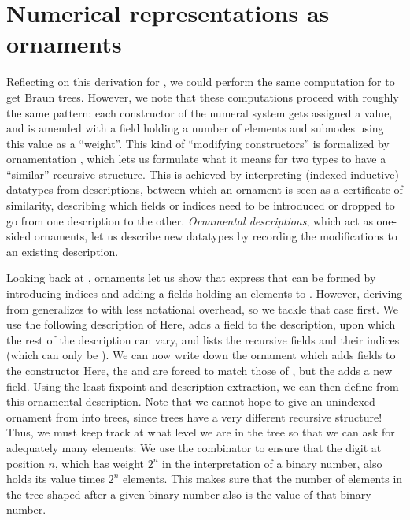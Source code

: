 \section{Numerical representations as ornaments}\label{sec:ornaments}
Reflecting on this derivation for \bN{}, we could perform the same computation for \bL{} to get Braun trees. However, we note that these computations proceed with roughly the same pattern: each constructor of the numeral system gets assigned a value, and is amended with a field holding a number of elements and subnodes using this value as a ``weight''. This kind of ``modifying constructors'' is formalized by ornamentation \cite{progorn}, which lets us formulate what it means for two types to have a ``similar'' recursive structure. This is achieved by interpreting (indexed inductive) datatypes from descriptions, between which an ornament is seen as a certificate of similarity, describing which fields or indices need to be introduced or dropped to go from one description to the other. \textit{Ornamental descriptions}, which act as one-sided ornaments, let us describe new datatypes by recording the modifications to an existing description.

Looking back at , ornaments let us show that express that  can be formed by introducing indices and adding a fields holding an elements to \bN{}.
However, deriving  from \bN{} generalizes to \bL{} with less notational overhead, so we tackle that case first. We use the following description of \bN{}
Here,  adds a field to the description, upon which the rest of the description can vary, and  lists the recursive fields and their indices (which can only be ).
We can now write down the ornament which adds fields to the  constructor
Here, the  and  are forced to match those of ,
but the  adds a new field. Using the least fixpoint and description extraction, we can then define  from this ornamental description. Note that we cannot hope to give an unindexed ornament from \bL{}
into trees, since trees have a very different recursive structure! Thus, we must keep track at what level we are in the tree so that we can ask for adequately many elements:
We use the  combinator to ensure that the digit at position $n$, which has weight $2^n$ in the interpretation of a binary number, also holds its value times $2^n$ elements. This makes sure that the number of elements in the tree shaped after a given binary number also is the value of that  binary number.



